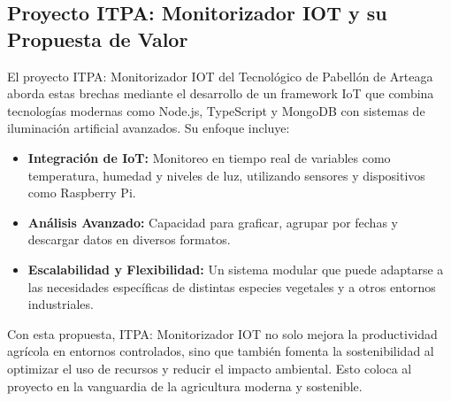 \subsection{Proyecto ITPA: Monitorizador IOT y su Propuesta de Valor}
El proyecto ITPA: Monitorizador IOT del Tecnológico de Pabellón de Arteaga aborda estas brechas mediante el desarrollo de un framework IoT que combina tecnologías modernas como Node.js, TypeScript y MongoDB con sistemas de iluminación artificial avanzados. Su enfoque incluye:
\begin{itemize}
    \item \textbf{Integración de IoT:} Monitoreo en tiempo real de variables como temperatura, humedad y niveles de luz, utilizando sensores y dispositivos como Raspberry Pi.
    \item \textbf{Análisis Avanzado:} Capacidad para graficar, agrupar por fechas y descargar datos en diversos formatos.
    \item \textbf{Escalabilidad y Flexibilidad:} Un sistema modular que puede adaptarse a las necesidades específicas de distintas especies vegetales y a otros entornos industriales.
\end{itemize}

Con esta propuesta, ITPA: Monitorizador IOT no solo mejora la productividad agrícola en entornos controlados, sino que también fomenta la sostenibilidad al optimizar el uso de recursos y reducir el impacto ambiental. Esto coloca al proyecto en la vanguardia de la agricultura moderna y sostenible.
